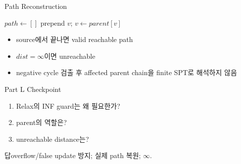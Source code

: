 \begin{frame}{Path Reconstruction}
\begin{algorithmic}[1]\State \(path\gets[]\)
\State prepend \(v\); \(v\gets parent[v]\)\EndWhile
\end{algorithmic}
\begin{itemize}\item source에서 끝나면 valid reachable path\item \(dist=\infty\)이면 unreachable\item negative cycle 검출 후 affected parent chain을 finite SPT로 해석하지 않음\end{itemize}
\end{frame}
\begin{frame}{Part L Checkpoint}
\begin{enumerate}\item Relax의 INF guard는 왜 필요한가?\item parent의 역할은?\item unreachable distance는?\end{enumerate}
\begin{exampleblock}{답}overflow/false update 방지; 실제 path 복원; \(\infty\).\end{exampleblock}
\end{frame}
